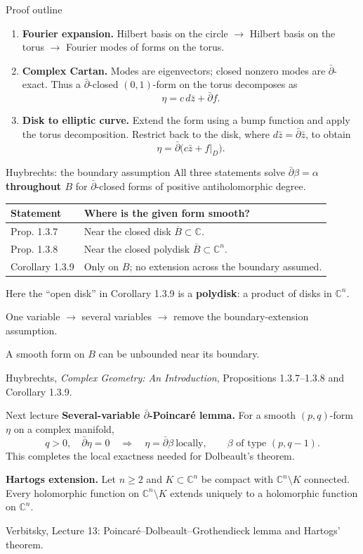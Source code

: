 \documentclass[aspectratio=169,11pt]{beamer}
\newcommand{\db}{\bar\partial}
\newcommand{\C}{\mathbb C}
\newcommand{\src}[1]{\par\vfill{\scriptsize #1\par}}
\begin{document}
\begin{frame}{Proof outline}
\begin{enumerate}
\item \textbf{Fourier expansion.}
Hilbert basis on the circle $\longrightarrow$ Hilbert basis on the torus
$\longrightarrow$ Fourier modes of forms on the torus.

\medskip
\item \textbf{Complex Cartan.}
Modes are eigenvectors; closed nonzero modes are $\db$-exact.
Thus a $\db$-closed $(0,1)$-form on the torus decomposes as
\[
 \eta=c\,d\bar z+\db f.
\]

\item \textbf{Disk to elliptic curve.}
Extend the form using a bump function and apply the torus decomposition.
Restrict back to the disk, where $d\bar z=\db\bar z$, to obtain
\[
 \eta=\db\bigl(c\bar z+f|_D\bigr).
\]
\end{enumerate}
\end{frame}

\begin{frame}{Huybrechts: the boundary assumption}
All three statements solve $\db\beta=\alpha$ \textbf{throughout $B$}
for $\db$-closed forms of positive antiholomorphic degree.

\medskip
\renewcommand{\arraystretch}{1.45}
\begin{tabular}{@{}p{2.5cm}p{9.8cm}@{}}
\textbf{Statement}&\textbf{Where is the given form smooth?}\\\hline
Prop. 1.3.7&Near the closed disk $\overline B\subset\C$.\\
Prop. 1.3.8&Near the closed polydisk $\overline B\subset\C^n$.\\
Corollary 1.3.9&Only on $B$; no extension across the boundary assumed.
\end{tabular}
\medskip

Here the ``open disk'' in Corollary 1.3.9 is a \textbf{polydisk}:
a product of disks in $\C^n$.

One variable $\longrightarrow$ several variables
$\longrightarrow$ remove the boundary-extension assumption.

A smooth form on $B$ can be unbounded near its boundary.
\src{Huybrechts, \emph{Complex Geometry: An Introduction},\newline
Propositions 1.3.7--1.3.8 and Corollary 1.3.9.}
\end{frame}

\begin{frame}{Next lecture}
\textbf{Several-variable $\db$-Poincar\'e lemma.}
For a smooth $(p,q)$-form $\eta$ on a complex manifold,
\[
 q>0,\quad\db\eta=0
 \quad\Longrightarrow\quad
 \eta=\db\beta\ \text{locally},
 \qquad \beta\text{ of type }(p,q-1).
\]
This completes the local exactness needed for Dolbeault's theorem.

\textbf{Hartogs extension.}
Let $n\geq2$ and $K\subset\C^n$ be compact with $\C^n\setminus K$
connected. Every holomorphic function on $\C^n\setminus K$
extends uniquely to a holomorphic function on $\C^n$.
\src{Verbitsky, Lecture 13: Poincar\'e--Dolbeault--Grothendieck lemma and Hartogs' theorem.}
\end{frame}
\end{document}
